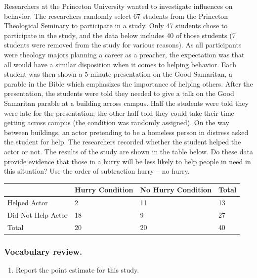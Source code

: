 \documentclass[
]{report}
\providecommand{\tightlist}{%
  \setlength{\itemsep}{0pt}\setlength{\parskip}{0pt}}
\begin{document}
Researchers at the Princeton University wanted to investigate influences on behavior. The researchers randomly select 67 students from the Princeton Theological Seminary to participate in a study. Only 47 students chose to participate in the study, and the data below includes 40 of those students (7 students were removed from the study for various reasons). As all participants were theology majors planning a career as a preacher, the expectation was that all would have a similar disposition when it comes to helping behavior. Each student was then shown a 5-minute presentation on the Good Samaritan, a parable in the Bible which emphasizes the importance of helping others. After the presentation, the students were told they needed to give a talk on the Good Samaritan parable at a building across campus. Half the students were told they were late for the presentation; the other half told they could take their time getting across campus (the condition was randomly assigned). On the way between buildings, an actor pretending to be a homeless person in distress asked the student for help. The researchers recorded whether the student helped the actor or not. The results of the study are shown in the table below. Do these data provide evidence that those in a hurry will be less likely to help people in need in this situation? Use the order of subtraction hurry -- no hurry.

\begin{longtable}[]{@{}llll@{}}
\toprule
& Hurry Condition & No Hurry Condition & Total \\
\midrule
\endhead
Helped Actor & 2 & 11 & 13 \\
Did Not Help Actor & 18 & 9 & 27 \\
Total & 20 & 20 & 40 \\
\bottomrule
\end{longtable}

\hypertarget{vocabulary-review.-3}{%
\subsubsection*{Vocabulary review.}\label{vocabulary-review.-3}}

\begin{enumerate}
\def\labelenumi{\arabic{enumi}.}
\tightlist
\item
  Report the point estimate for this study.
\end{enumerate}

\vspace{0.4in}
\end{document}
